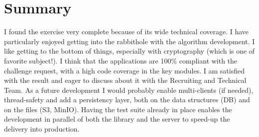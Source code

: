 \documentclass[11pt]{article}
\begin{document}
\section{Summary}
\label{sec:orge733856}
I found the exercise very complete because of its wide technical coverage. I have particularly enjoyed getting into the rabbithole with the algorithm development. I like getting to the bottom of things, especially with  cryptography (which is one of favorite subject!). 
I think that the applications are 100\% compliant with the challenge request, with a high code coverage in the key modules. I am satisfied with the result and eager to discuss about it with the Recruiting and Technical Team.
As a future development I would probably enable multi-clients (if needed), thread-safety and add a persistency layer, both on the data structures (DB) and on the files (S3, MinIO). Having the test suite already in place enables the development in parallel of both the library and the server to speed-up the delivery into production.
\end{document}
